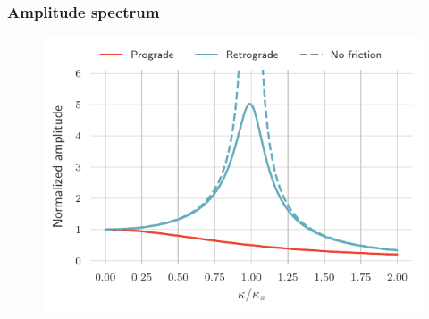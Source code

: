 \documentclass{beamer}
\begin{document}
\begin{frame}
\frametitle{Amplitude spectrum}
\begin{figure}
\centering
\includegraphics{figures/amplitude_phase.pdf}
\end{figure}
\end{frame}
\end{document}
